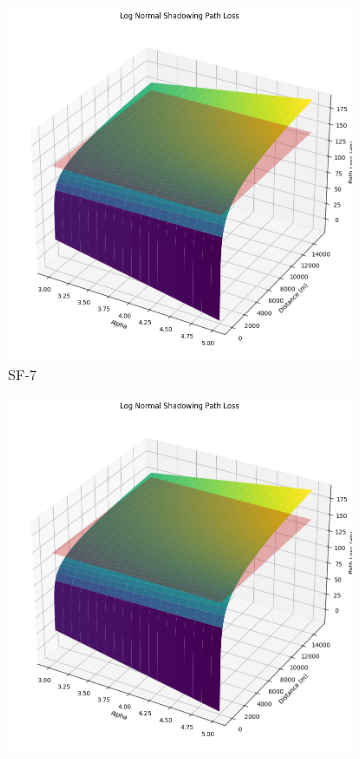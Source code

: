             \begin{figure}
     \centering
     \begin{subfigure}[b]{0,45\textwidth}
         \centering
         \includegraphics[width=\textwidth]{images/sf-7.jpg}
         \caption{SF-7}
         \label{fig:sf-7}
     \end{subfigure}
     \hfill
     \begin{subfigure}[b]{0,45\textwidth}
         \centering
         \includegraphics[width=\textwidth]{images/sf-8.jpg}

\end{subfigure}
\end{figure}
